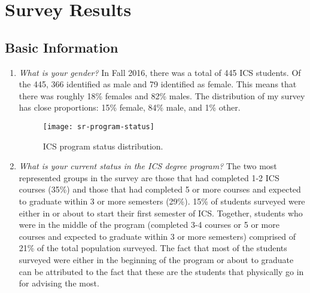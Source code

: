 \chapter{Survey Results}
\label{survey-results}

\section{Basic Information}
\begin{enumerate}
\begin{figure}[h]
\centering
\texttt{[image: sr-gender]}
\caption{Gender distribution.}
\end{figure}
\item \textit{What is your gender?}
In Fall 2016, there was a total of 445 ICS students. Of the 445, 366 identified as male and 79 identified as female. This means that there was roughly 18\% females and 82\% males. The distribution of my survey has close proportions: 15\% female, 84\% male, and 1\% other. 
\begin{figure}[h]
\centering
\texttt{[image: sr-program-status]}
\caption{ICS program status distribution.}
\end{figure}
\item \textit{What is your current status in the ICS degree program?}
The two most represented groups in the survey are those that had completed 1-2 ICS courses (35\%) and those that had completed 5 or more courses and expected to graduate within 3 or more semesters (29\%). 15\% of students surveyed were either in or about to start their first semester of ICS. Together, students who were in the middle of the program (completed 3-4 courses or 5 or more courses and expected to graduate within 3 or more semesters) comprised of 21\% of the total population surveyed. The fact that most of the students surveyed were either in the beginning of the program or about to graduate can be attributed to the fact that these are the students that physically go in for advising the most. 
\end{enumerate}

